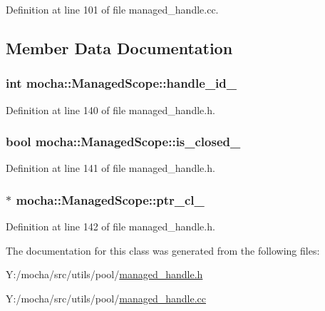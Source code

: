 Definition at line 101 of file managed\_\-handle.cc.



\subsection{Member Data Documentation}
\hypertarget{classmocha_1_1_managed_scope_a7a7ee1af9f567cb9deddddccc8a323db}{
\subsubsection[{handle\_\-id\_\-}]{\setlength{\rightskip}{0pt plus 5cm}int {\bf mocha::ManagedScope::handle\_\-id\_\-}}}
\label{classmocha_1_1_managed_scope_a7a7ee1af9f567cb9deddddccc8a323db}


Definition at line 140 of file managed\_\-handle.h.

\hypertarget{classmocha_1_1_managed_scope_af099e3c1891dcd651a76625394eeb20c}{
\subsubsection[{is\_\-closed\_\-}]{\setlength{\rightskip}{0pt plus 5cm}bool {\bf mocha::ManagedScope::is\_\-closed\_\-}}}
\label{classmocha_1_1_managed_scope_af099e3c1891dcd651a76625394eeb20c}


Definition at line 141 of file managed\_\-handle.h.

\hypertarget{classmocha_1_1_managed_scope_aead7ff3a10380d3fb0bf85f5a06071ae}{
\subsubsection[{ptr\_\-cl\_\-}]{$\ast$ {\bf mocha::ManagedScope::ptr\_\-cl\_\-}}}
\label{classmocha_1_1_managed_scope_aead7ff3a10380d3fb0bf85f5a06071ae}


Definition at line 142 of file managed\_\-handle.h.



The documentation for this class was generated from the following files:\begin{DoxyCompactItemize}
\item 
Y:/mocha/src/utils/pool/\hyperlink{managed__handle_8h}{managed\_\-handle.h}\item 
Y:/mocha/src/utils/pool/\hyperlink{managed__handle_8cc}{managed\_\-handle.cc}\end{DoxyCompactItemize}
